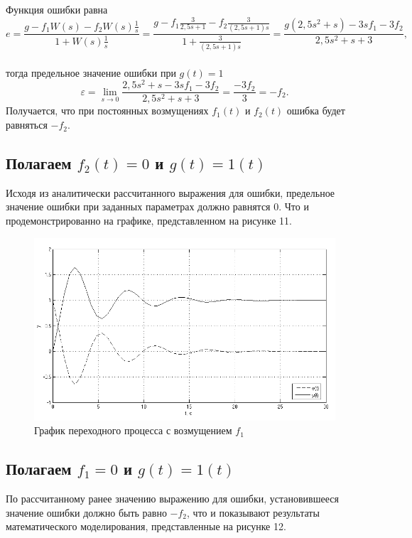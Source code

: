 \documentclass[a4paper, 11pt, russian]{article}
\begin{document}
    Функция ошибки равна $$e = \frac{g - f_1W(s) - f_2W(s)\displaystyle{\frac{1}{s}}}{1 + W(s)\displaystyle{\frac{1}{s}}} = \frac{g - f_1\displaystyle{\frac{3}{2,5s + 1}} - f_2\displaystyle{\frac{3}{(2,5s + 1)s}}}{1 + \displaystyle{\frac{3}{(2,5s + 1)s}}} = \frac{g(2,5s^2 + s) - 3sf_1 - 3f_2}{2,5s^2 + s + 3},$$\\
    тогда предельное значение ошибки при $g(t) = 1$ $$\varepsilon = \lim_{s\to0} \frac{2,5s^2 + s - 3sf_1 - 3f_2}{2,5s^2 + s + 3} = \frac{-3f_2}{3} = -f_2.$$
    Получается, что при постоянных возмущениях $f_1(t)$ и $f_2(t)$ ошибка будет равняться $-f_2$.
    \subsection{Полагаем $f_2(t) = 0$ и $g(t) = 1(t)$}
    Исходя из аналитически рассчитанного выражения для ошибки, предельное значение ошибки при заданных параметрах должно равнятся 0. Что и продемонстрированно на графике, представленном на рисунке 11.
    
    \begin{figure}[ht!]
        \centering
        \includegraphics[scale = 0.75]{disturbance1.png}
        \caption{График переходного процесса с возмущением $f_1$}
    \end{figure}
    \vspace{4.5cm}
    \subsection{Полагаем $f_1 = 0$ и $g(t) = 1(t)$}
    По рассчитанному ранее значению выражению для ошибки, установившееся значение ошибки должно быть равно $-f_2$, что и показывают результаты математического моделирования, представленные на рисунке 12.
    
\end{document}
